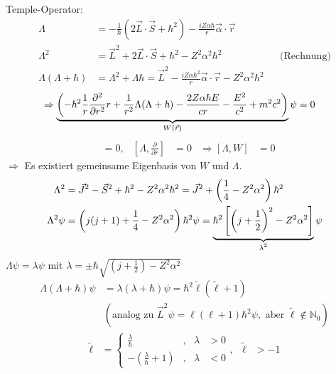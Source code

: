 Temple-Operator: 
	\begin{align*}
		\Lambda &= -\frac{1}{\hbar} (2 \vec{L} \cdot \vec{S} + \hbar^2) 
		- \frac{i Z \alpha \hbar}{r} \vec{\alpha} \cdot \vec{r} \\
		\Lambda^2 &= \vec{L}^2 + 2 \vec{L} \cdot \vec{S} + \hbar^2
		- Z^2 \alpha^2 \hbar^2 & &\text{(Rechnung)} \\
		\Lambda (\Lambda + \hbar) &= \Lambda^2 + \Lambda \hbar =
		\vec{L}^2 - \frac{i Z \alpha \hbar^2}{r} \vec{\alpha} \cdot \vec{r}
		- Z^2 \alpha^2 \hbar^2
	\end{align*}
	\begin{align*}
		\Rightarrow \underbrace{ \left(
				-\hbar^2 \frac{1}{r} \frac{\partial^2}{\partial r^2} r 
				+ \frac{1}{r^2} \Lambda (\Lambda + \hbar) 
				-\frac{2Z\alpha \hbar E}{cr} -\frac{E^2}{c^2} + m^2c^2
			\right)}_{\mathclap{W(\vec{r})}} \psi
		&= 0
	\end{align*}
	\begin{align*}
		[\Lambda, r] &= 0 ,& \left[\Lambda, \frac{\partial}{\partial r}\right] &= 0 
		&\Rightarrow [\Lambda, W] &= 0
	\end{align*}
$\Rightarrow$ Es existiert gemeinsame Eigenbasis von $W$ und $\Lambda$.
	\begin{align*}
		\Lambda^2 &= \vec{J}^2 - \vec{S}^2 + \hbar^2 - Z^2 \alpha^2 \hbar^2 
		= \vec{J}^2 + \left(\frac{1}{4} - Z^2\alpha^2\right) \hbar^2 \\
		\Lambda^2 \psi &= 
		\left(j (j+1) + \frac{1}{4} - Z^2 \alpha^2\right) \hbar^2 \psi 
		= \underbrace{\hbar^2 \left[\left(j + \frac{1}{2}\right)^2 - Z^2 \alpha^2\right]}_{\mathclap{\lambda^2}} \psi  
	\end{align*}
$\Lambda \psi = \lambda \psi$ mit $\lambda = \pm \hbar \sqrt{\left(j + \frac{1}{2}\right) - Z^2\alpha^2}$ 
	\begin{align*}
		\Lambda(\Lambda + \hbar) \psi &= \lambda(\lambda + \hbar) \psi =
		\hbar^2 \tilde{\ell} (\tilde{\ell} + 1) \\
		&(\text{analog zu } \vec{L}^2 \psi = \ell(\ell + 1) \hbar^2 \psi, \text{ aber } \tilde{\ell} \notin \mathds{N}_0)
	\end{align*}
	\begin{align*}
		\tilde{\ell} &=
		\left\{ 
		\begin{aligned}
			\frac{\lambda}{\hbar}& ,& \lambda &> 0 \\
			-\left(\frac{\lambda}{\hbar} + 1\right)& ,& \lambda &< 0
		\end{aligned}
		\right.
		,& 
		\tilde{\ell} &> -1
	\end{align*}
